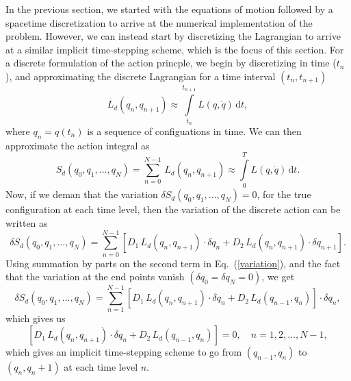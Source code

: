 \documentclass[nofootinbib,preprintnumbers,superscriptaddress,notitlepage]{revtex4-1}
\newcommand{\<}{\begin{equation}}
\newcommand{\?}{\end{equation}}
\begin{document}
In the previous section, we started with the equations of motion followed by a
spacetime discretization to arrive at the numerical implementation of the
problem. However, we can instead start by discretizing the Lagrangian to
arrive at a similar implicit time-stepping scheme, which is the focus of this
section. For a discrete formulation of the action princple, we begin by
discretizing in time ($t_n$), and approximating the discrete Lagrangian for a
time interval $(t_n, t_{n+1})$
\begin{equation}
\label{discretized_lagrangian}
L_d(q_{n}, q_{n+1}) \approx \int\limits_{t_n}^{t_{n+1}} L(q, \dot{q})\, \textrm{d}t,
\end{equation}
where $q_n = q(t_n)$ is a sequence of configuations in time. We can then
approximate the action integral as
\begin{equation}
S_d(q_0, q_1, ..., q_N) = \sum\limits_{n=0}^{N-1} \,L_d (q_n, q_{n+1})
\approx \int\limits_{0}^{T} L(q, \dot{q})\, \textrm{d}t.
\end{equation}
Now, if we deman that the variation $\delta S_d(q_0, q_1, ..., q_N) = 0$, for
the true configuration at each time level, then the variation of the discrete
action can be written as
\begin{equation}
\label{variation}
\delta S_d(q_0, q_1, ..., q_N) = \sum\limits_{n=0}^{N-1} \left[D_1 \,L_d (q_n, q_{n+1})\cdot \delta q_n 
+ D_2\,L_d (q_n, q_{n+1})\cdot \delta q_{n+1}\right].
\end{equation}
Using summation by parts on the second term in Eq.~(\ref{variation}), and the
fact that the variation at the end points vanish $(\delta q_0 = \delta q_N = 0)$,
we get
\begin{equation}
\delta S_d(q_0, q_1, ..., q_N) = \sum\limits_{n=1}^{N-1}  \left[ D_1 \,L_d (q_{n}, q_{n+1})\cdot \delta q_n 
+ D_2\,L_d (q_{n-1}, q_{n}) \right] \cdot \delta q_{n},
\end{equation}
which gives us
\begin{equation}
\label{finalform_variational}
 \left[ D_1 \,L_d (q_{n}, q_{n+1})\cdot \delta q_n 
+ D_2\,L_d (q_{n-1}, q_{n}) \right] = 0, \quad n = 1, 2,...,N-1,
\end{equation}
which gives an implicit time-stepping scheme to go from $(q_{n-1}, q_n)$ to $(q_n, q_n+1)$ at each time level $n$. \\


\end{document}
